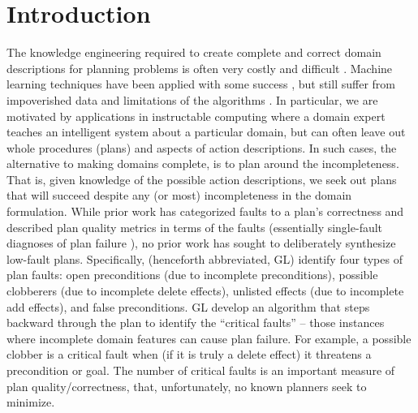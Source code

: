 \documentclass{article}
\def\citep#1{\cite{#1}}
\def\citet#1{\citeA{#1}}
\def\und#1{\noindent{\bf #1}:}
\def\und#1{\medskip{\noindent\bf #1:}}
\begin{document}
\section{Introduction}
%
%
%
%
The knowledge engineering required to create complete and correct domain descriptions for planning problems is often very costly and difficult \citep{modellite,arms}.  Machine learning techniques have been applied with some success \citep{arms, ickeps09}, but still suffer from impoverished data and limitations of the algorithms \citep{modellite}.   In particular, we are motivated by applications in instructable computing \citep{mable} where a domain expert teaches an intelligent system about a particular domain, but can often leave out whole procedures (plans) and aspects of action descriptions.   In such cases, the alternative to making domains complete, is to plan around the incompleteness.  That is, given knowledge of the possible action descriptions, we seek out plans that will succeed despite any (or most) incompleteness in the domain formulation. 
%
%
While prior work \citep{Garland02} has categorized faults to a plan's correctness and described plan quality metrics in terms of the faults (essentially single-fault diagnoses of plan failure \citep{dekleer,reiter}), no prior work has sought to deliberately synthesize low-fault plans.  Specifically, \citet{Garland02} (henceforth abbreviated, GL) identify four types of plan faults: open preconditions (due to incomplete preconditions), possible clobberers (due to incomplete delete effects), unlisted effects (due to incomplete add effects), and false preconditions.  GL develop an algorithm that steps backward through the plan to identify the ``critical faults'' -- those instances where incomplete domain features can cause plan failure.  For example, a possible clobber is a critical fault when (if it is truly a delete effect) it threatens a precondition or goal.  The number of critical faults is an important measure of plan quality/correctness, that, unfortunately, no known planners seek to minimize.    
%
%
\end{document}
